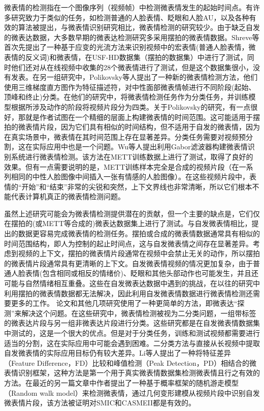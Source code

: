 微表情的检测指在一个图像序列（视频帧）中检测微表情发生的起始时间点。有许多研究致力于类似的任务，如检测普通的人脸表情、眨眼和人脸AU\citep{zeng2006spontaneous,Kr2012Eye, Liwicki2012Incremental}，以及各种有效的算法被提出，与微表情识别研究相比，微表情检测的研究较少。由于缺乏自发的微表达数据，大多数早期的微表达检测研究多采用摆拍的微表情数据。Shreve等首次先提出了一种基于应变的光流方法来识别视频中的宏表情(普通人脸表情，微表情的反义词)和微表情，在USF-HD数据集（摆拍的数据集）中进行了测试，同时他们还对从在线视频中收集的28个微表情进行了测试，但是这个数据集很小，没有发表\citep{shreve2009towards, Shreve2011Macro}。在另一组研究中，Polikovsky等人提出了一种新的微表情检测方法，他们使用三维梯度直方图作为特征描述符，对中性面部微表情帧进行不同阶段(起始、顶峰和终止)分类\citep{Polikovsky2009Facial, Polikovsky2013Facial}。在他们的研究中，将微表情检测任务作为分类任务，并训练模型根据所涉及动作的阶段将视频片段分为四类。关于Polikovsky的研究，有一点很好，那就是作者试图在一个精细的层面上构建微表情的时间范围。这可能适用于摆拍的微表情片段，因为它们具有相似的时间结构，但不适用于自发的微表情，因为在真实场景中，微表情在其时间范围上存在显著差异。分类任务需要对视频预分割，这在实际应用中也是一个问题。Wu等人提出利用Gabor滤波器构建微表情识别系统进行微表情检测\citep{Qi2011The}。该方法在METT训练数据上进行了测试，取得了良好的效果。但有一点需要说明的是，METT训练样本完全是合成的视频片段（在一系列相同的中性人脸图像中间插入一张有情感的人脸图像）。在这些视频片段中，表情的“开始”和“结束”非常的尖锐和突然，上下文界线也非常清晰，所以它们根本不能代表计算机真正的微表情检测问题。

虽然上述研究可能会为微表情检测提供潜在的贡献，但一个主要的缺点是，它们仅在摆拍的(或METT等合成的)微表达数据集上进行了测试。与自发微表情相比，提出的数据更容易完成微表情的检测任务。摆拍或合成的微表情数据通常具有相似的时间范围结构，即人为控制的起止时间点，这与自发微表情之间存在显著差异。考虑到视频的上下文，摆拍的微表情片段通常在视频中会禁止无关的动作，所以摆拍的微表情片段通常具有更清晰的上下文。自发微表情视频的情况更加复杂，由于普通人脸表情(包含相同或相反的情绪价\citep{Warren2009Detecting})、眨眼和其他头部动作也可能发生，并且还可能与自然情绪相互重叠。这些在自发微表达数据中遇到的挑战，在以往的研究中利用摆拍的微表情数据都无法解决，因此利用自发微表情数据进行微表情检测还需要更多的工作。
论文和其他几项研究使用了一种更简单的方法，即微表达“探测”来解决这个问题\citep{ruiz2013encoding, Davison2014Micro, Yao2014Micro}。在这些研究中，微表情检测被视为二分类问题，一组带标签的微表达片段与另一组非微表达片段进行分类。这些研究都是在自发微表情数据集中测试的，这是一个很大的优点。但是对于分类任务，训练和测试视频都需要进行适当的分割，这在实际应用中可能会遇到困难。二分类方法与直接从长视频中提取自发微表情的实际应用目标仍有较大差异。Li等人提出了一种将特征差异（Feature Difference，FD）比较和峰值检测（Peak Detection，PD）相结合的微表情识别框架，这种方法是第一个用于真实微表情数据集检测微表情且行之有效的方法\citep{pfister2011recognising}。在最近的另一篇文章中作者提出了一种基于概率框架的随机游走模型（Random walk model）来检测微表情，通过几何变形建模从视频片段中识别自发微表情片段，该方法被证明对SMIC和CASMEII都是有效的\citep{Xia2016Spontaneous}。

